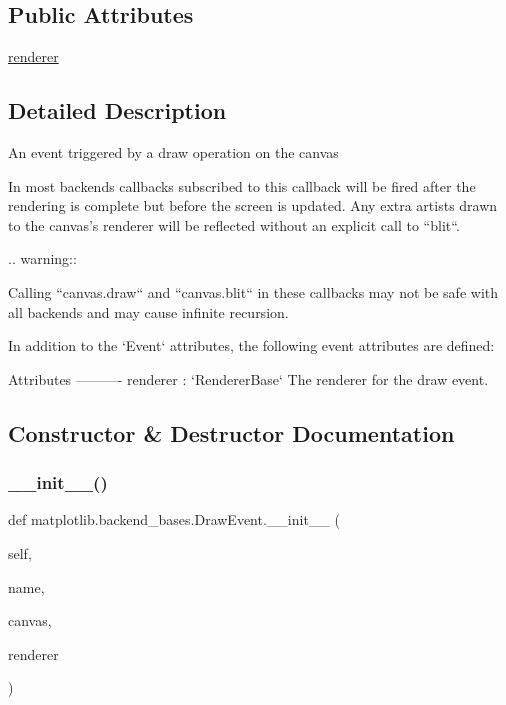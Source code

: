 \subsection*{Public Attributes}
\begin{DoxyCompactItemize}
\item 
\hyperlink{classmatplotlib_1_1backend__bases_1_1DrawEvent_ae702afe085dcd8aa2fbd6b1ac80a10d3}{renderer}
\end{DoxyCompactItemize}


\subsection{Detailed Description}
\begin{DoxyVerb}An event triggered by a draw operation on the canvas

In most backends callbacks subscribed to this callback will be
fired after the rendering is complete but before the screen is
updated.  Any extra artists drawn to the canvas's renderer will
be reflected without an explicit call to ``blit``.

.. warning::

   Calling ``canvas.draw`` and ``canvas.blit`` in these callbacks may
   not be safe with all backends and may cause infinite recursion.

In addition to the `Event` attributes, the following event
attributes are defined:

Attributes
----------
renderer : `RendererBase`
    The renderer for the draw event.
\end{DoxyVerb}
 

\subsection{Constructor \& Destructor Documentation}
\mbox{\label{classmatplotlib_1_1backend__bases_1_1DrawEvent_aedf520abb31386ce4d87ea9f076cae4c}} 
\subsubsection{\texorpdfstring{\+\_\+\+\_\+init\+\_\+\+\_\+()}{\_\_init\_\_()}}
{\footnotesize\ttfamily def matplotlib.\+backend\+\_\+bases.\+Draw\+Event.\+\_\+\+\_\+init\+\_\+\+\_\+ (\begin{DoxyParamCaption}\item[{}]{self,  }\item[{}]{name,  }\item[{}]{canvas,  }\item[{}]{renderer }\end{DoxyParamCaption})}



